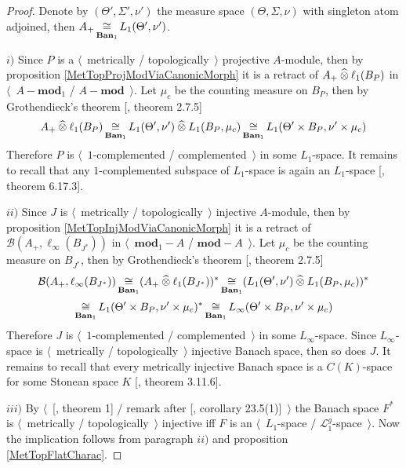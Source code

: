 \begin{proof} 

Denote by $(\Theta',\Sigma',\nu')$ the measure space $(\Theta,\Sigma,\nu)$ with singleton atom adjoined, then $A_+\mathop{\mathbin{\cong}}\limits_{\mathbf{Ban}_1} L_1(\Theta',\nu')$.

$i)$ Since $P$ is a $\langle$~metrically / topologically~$\rangle$ projective $A$-module, then by proposition \ref{MetTopProjModViaCanonicMorph} it is a retract of $A_+\mathbin{\widehat{\otimes}} \ell_1(B_P)$ in $\langle$~$A-\mathbf{mod}_1$ / $A-\mathbf{mod}$~$\rangle$. Let $\mu_c$ be the counting measure on $B_P$, then by Grothendieck's theorem [\cite{HelLectAndExOnFuncAn}, theorem 2.7.5]
$$
A_+\mathbin{\widehat{\otimes}}\ell_1(B_P)
\mathop{\mathbin{\cong}}\limits_{\mathbf{Ban}_1}L_1(\Theta',\nu')\mathbin{\widehat{\otimes}} L_1(B_P,\mu_c)
\mathop{\mathbin{\cong}}\limits_{\mathbf{Ban}_1}L_1(\Theta'\times B_P,\nu'\times \mu_c)
$$
Therefore $P$ is $\langle$~$1$-complemented / complemented~$\rangle$ in some $L_1$-space. It remains to recall that any $1$-complemented subspace of $L_1$-space is again an $L_1$-space [\cite{LaceyIsomThOfClassicBanSp}, theorem 6.17.3].

$ii)$ Since $J$ is $\langle$~metrically / topologically~$\rangle$ injective $A$-module, then by proposition \ref{MetTopInjModViaCanonicMorph} it is a retract of $\mathcal{B}(A_+,\ell_\infty(B_{J^*}))$ in $\langle$~$\mathbf{mod}_1-A$ / $\mathbf{mod}-A$~$\rangle$. Let $\mu_c$ be the counting measure on $B_{J^*}$, then by Grothendieck's theorem [\cite{HelLectAndExOnFuncAn}, theorem 2.7.5]
$$
\mathcal{B}(A_+,\ell_\infty(B_{J^*}))
\mathop{\mathbin{\cong}}\limits_{\mathbf{Ban}_1}(A_+\mathbin{\widehat{\otimes}} \ell_1(B_{J^*}))^*
\mathop{\mathbin{\cong}}\limits_{\mathbf{Ban}_1}(L_1(\Theta',\nu')\mathbin{\widehat{\otimes}} L_1(B_P,\mu_c))^*
$$
$$
\mathop{\mathbin{\cong}}\limits_{\mathbf{Ban}_1}L_1(\Theta'\times B_P,\nu'\times \mu_c)^*
\mathop{\mathbin{\cong}}\limits_{\mathbf{Ban}_1}L_\infty(\Theta'\times B_P,\nu'\times \mu_c)
$$
Therefore $J$ is $\langle$~$1$-complemented / complemented~$\rangle$ in some $L_\infty$-space. Since $L_\infty$-space is $\langle$~metrically / topologically~$\rangle$ injective Banach space, then so does $J$. It remains to recall that every metrically injective Banach space is a $C(K)$-space for some Stonean space $K$ [\cite{LaceyIsomThOfClassicBanSp}, theorem 3.11.6].

$iii)$  By $\langle$~[\cite{GrothMetrProjFlatBanSp}, theorem 1] / remark after [\cite{DefFloTensNorOpId}, corollary 23.5(1)]~$\rangle$ the Banach space $F^*$ is $\langle$~metrically / topologically~$\rangle$ injective iff $F$ is an $\langle$~$L_1$-space / $\mathscr{L}_1^g$-space~$\rangle$. Now the implication follows from paragraph $ii)$ and proposition \ref{MetTopFlatCharac}.
\end{proof}

